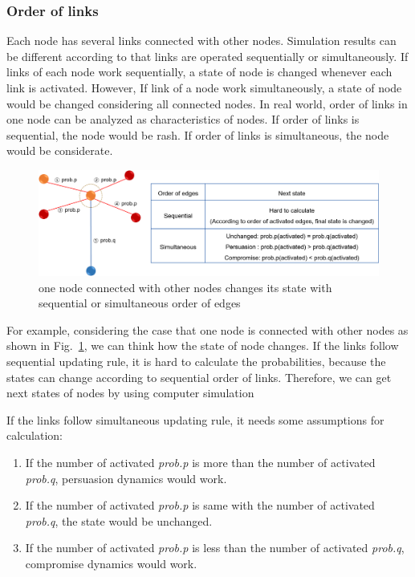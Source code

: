 \documentclass[review]{elsarticle}
\begin{document}
\subsubsection{Order of links}
Each node has several links connected with other nodes. Simulation results can be different according to that links are operated sequentially or simultaneously. If links of each node work sequentially, a state of node is changed whenever each link is activated. However, If link of a node work simultaneously, a state of node would be changed considering all connected nodes. In real world, order of links in one node can be analyzed as characteristics of nodes. If order of links is sequential, the node would be rash. If order of links is simultaneous, the node would be considerate. 
\begin{figure}[!htb]
	\centering
	\includegraphics[width=\hsize]{edgeorder_explanation.png}
	\caption{one node connected with other nodes changes its state with sequential or simultaneous order of edges}
	\label{edgeorder_explanation}
\end{figure}  
For example, considering the case that one node is connected with other nodes as shown in Fig.~\ref{edgeorder_explanation}, we can think how the state of node changes. 
If the links follow sequential updating rule, it is hard to calculate the probabilities, because the states can change according to sequential order of links. Therefore, we can get next states of nodes by using computer simulation 

If the links follow simultaneous updating rule, it needs some assumptions for calculation: 
\begin{enumerate}[(1)]
	\item If the number of activated \textit{prob.p} is more than the number of activated \textit{prob.q}, persuasion dynamics would work. 
	\item If the number of activated \textit{prob.p} is same with the number of activated \textit{prob.q}, the state would be unchanged.
	\item If the number of activated \textit{prob.p} is less than the number of activated \textit{prob.q}, compromise dynamics would work.
\end{enumerate}
\end{document}

